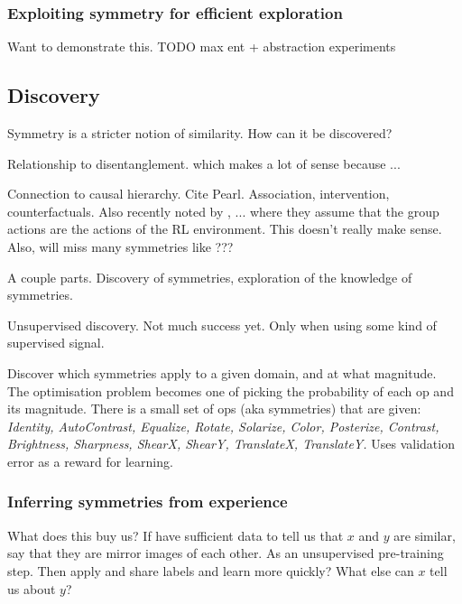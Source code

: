 \subsubsection{Exploiting symmetry for efficient exploration}

\cite{Holtzen2019}

Want to demonstrate this.
{\color{red}TODO max ent + abstraction experiments}

\subsection{Discovery}


Symmetry is a stricter notion of similarity. How can it be discovered?

Relationship to disentanglement. \cite{Higgins2018} which makes a lot of sense because ...

Connection to causal hierarchy. Cite Pearl. Association, intervention, counterfactuals.
Also recently noted by \cite{Caselles-Dupre2019}, ... where they assume that
the group actions are the actions of the RL environment.
This doesn't really make sense. Also, will miss many symmetries like ???

A couple parts. Discovery of symmetries, exploration of the knowledge of symmetries.

Unsupervised discovery. Not much success yet. Only when using some kind of supervised signal.

\cite{Ho2019a, Lim2019, Cubuk2018, Cubuk2019}
Discover which symmetries apply to a given domain, and at what magnitude.
The optimisation problem becomes one of picking the probability of each op and its magnitude.
There is a small set of ops (aka symmetries) that are given:
\textit{Identity, AutoContrast, Equalize, Rotate, Solarize, Color, Posterize, Contrast,
	Brightness, Sharpness, ShearX, ShearY, TranslateX, TranslateY.}
Uses validation error as a reward for learning.


\subsubsection{Inferring symmetries from experience}



What does this buy us? If have sufficient data to tell us that $x$ and $y$ are
similar, say that they are mirror images of each other.
As an unsupervised pre-training step. Then apply and share labels and learn more quickly?
What else can $x$ tell us about $y$?


